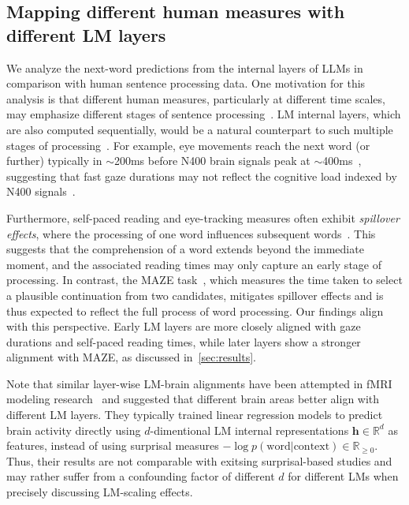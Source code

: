 \subsection{Mapping different human measures with different LM layers}
\label{subsec:layer_motivation}
We analyze the next-word predictions from the internal layers of LLMs in comparison with human sentence processing data. 
One motivation for this analysis is that different human measures, particularly at different time scales, may emphasize different stages of sentence processing~\cite{Witzel2012-nr,Lewis2005-hp,Vani2021-aj,Caucheteux2023-tx,McCurdy2024-ix}. 
LM internal layers, which are also computed sequentially, would be a natural counterpart to such multiple stages of processing~\cite{Tenney2019-bb}.
For example, eye movements reach the next word (or further) typically in $\sim$200ms before N400 brain signals peak at $\sim$400ms~\cite{Dimigen2011-gt}, suggesting that fast gaze durations may not reflect the cognitive load indexed by N400 signals~\cite{Rayner2009-aw}. 

Furthermore, self-paced reading and eye-tracking measures often exhibit \textit{spillover effects}, where the processing of one word influences subsequent words~\cite{Rayner1998-rw}. This suggests that the comprehension of a word extends beyond the immediate moment, and the associated reading times may only capture an early stage of processing.
In contrast, the MAZE task~\cite{Forster2009-dp,Boyce2023AmazeON}, which measures the time taken to select a plausible continuation from two candidates, mitigates spillover effects and is thus expected to reflect the full process of word processing. 
Our findings align with this perspective. Early LM layers are more closely aligned with gaze durations and self-paced reading times, while later layers show a stronger alignment with MAZE, as discussed in~\cref{sec:results}.

Note that similar layer-wise LM-brain alignments have been attempted in fMRI modeling research~\cite{Toneva2019-ul,Schrimpf2020-qa,Caucheteux2023-tx} and suggested that different brain areas better align with different LM layers.
They typically trained linear regression models to predict brain activity directly using $d$-dimentional LM internal representations $\bm h \in \mathbb{R}^d$ as features, instead of using surprisal measures $-\log p(\mathrm{word}|\mathrm{context})\in \mathbb{R}_{\ge 0}$.
Thus, their results are not comparable with exitsing surprisal-based studies and may rather suffer from a confounding factor of different $d$ for different LMs when precisely discussing LM-scaling effects. 

